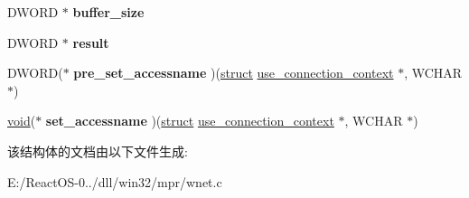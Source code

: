 \begin{DoxyCompactItemize}
D\+W\+O\+RD $\ast$ {\bfseries buffer\+\_\+size}
\item 
\mbox{\label{structuse__connection__context_a3ed6c4564203535742006c98b1d00aa9}} 
D\+W\+O\+RD $\ast$ {\bfseries result}
\item 
\mbox{\label{structuse__connection__context_a3a4b026b180d2c3c7909c99422b2b5bd}} 
D\+W\+O\+RD($\ast$ {\bfseries pre\+\_\+set\+\_\+accessname} )(\hyperlink{interfacestruct}{struct} \hyperlink{structuse__connection__context}{use\+\_\+connection\+\_\+context} $\ast$, W\+C\+H\+AR $\ast$)
\item 
\mbox{\label{structuse__connection__context_a22490a27e825ccbb3ca6b36937589a37}} 
\hyperlink{interfacevoid}{void}($\ast$ {\bfseries set\+\_\+accessname} )(\hyperlink{interfacestruct}{struct} \hyperlink{structuse__connection__context}{use\+\_\+connection\+\_\+context} $\ast$, W\+C\+H\+AR $\ast$)
\end{DoxyCompactItemize}


该结构体的文档由以下文件生成\+:\begin{DoxyCompactItemize}
\item 
E\+:/\+React\+O\+S-\/0../dll/win32/mpr/wnet.\+c\end{DoxyCompactItemize}
